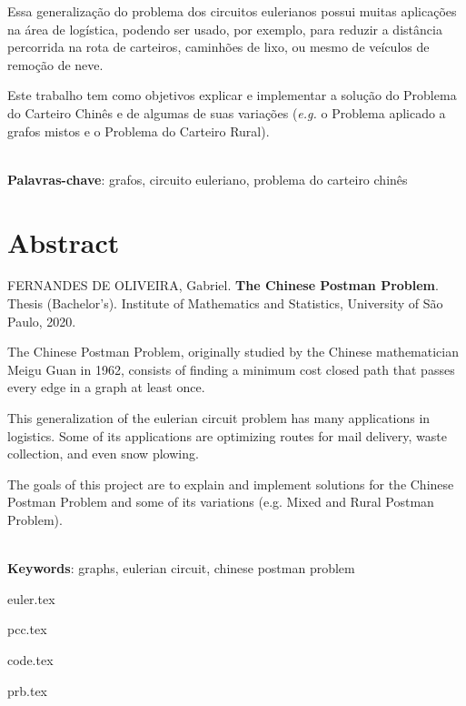 \documentclass[12pt,twoside,english,brazilian]{book}
\begin{document}
Essa generalização do problema dos circuitos eulerianos possui muitas aplicações na área de logística, podendo ser usado, por exemplo, para reduzir a distância percorrida na rota de carteiros, caminhões de lixo, ou mesmo de veículos de remoção de neve.

Este trabalho tem como objetivos explicar e implementar a solução do Problema do Carteiro Chinês e de algumas de suas variações (\textit{e.g.} o Problema aplicado a grafos mistos e o Problema do Carteiro Rural).


\noindent \\ \textbf{Palavras-chave}: grafos, circuito euleriano, problema do carteiro chinês



\chapter*{Abstract}

FERNANDES DE OLIVEIRA, Gabriel. \textbf{The Chinese Postman Problem}. Thesis (Bachelor's). Institute of Mathematics and Statistics, University of São Paulo, 2020.

\vspace{10pt}

The Chinese Postman Problem, originally studied by the Chinese mathematician Meigu Guan in 1962, consists of finding a minimum cost closed path that passes every edge in a graph at least once.

This generalization of the eulerian circuit problem has many applications in logistics. Some of its applications are optimizing routes for mail delivery, waste collection, and even snow plowing.

The goals of this project are to explain and implement solutions for the Chinese Postman Problem and some of its variations (e.g. Mixed and Rural Postman Problem).


\noindent \\ \textbf{Keywords}: graphs, eulerian circuit, chinese postman problem



\mainmatter


\singlespacing

\newpage

\tableofcontents

\newpage

{euler.tex}

{pcc.tex}

{code.tex}

{prb.tex}

\medskip

\newpage
\printbibliography
 
\end{document}
